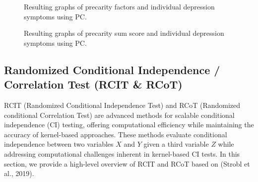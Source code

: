 \documentclass[
]{article}
\begin{document}
\begin{figure}
\begin{minipage}{\linewidth}
{}


\end{minipage}%

\caption{\label{fig-pc_sym}Resulting graphs of precarity factors and
individual depression symptoms using PC.}

\end{figure}%

\begin{figure}


\caption{\label{fig-pc_presum}Resulting graphs of precarity sum score
and individual depression symptoms using PC.}

\end{figure}%

\clearpage

\subsection{Randomized Conditional Independence / Correlation Test (RCIT
\& RCoT)}\label{sec-rcot}

RCIT (Randomized Conditional Independence Test) and RCoT (Randomized
conditional Correlation Test) are advanced methods for scalable
conditional independence (CI) testing, offering computational efficiency
while maintaining the accuracy of kernel-based approaches. These methods
evaluate conditional independence between two variables \(X\) and \(Y\)
given a third variable \(Z\) while addressing computational challenges
inherent in kernel-based CI tests. In this section, we provide a
high-level overview of RCIT and RCoT based on (Strobl et al., 2019).
\end{document}
